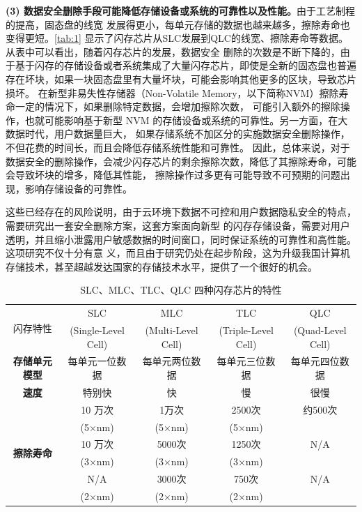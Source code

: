 \textbf{(3) 数据安全删除手段可能降低存储设备或系统的可靠性以及性能。}由于工艺制程的提高，固态盘的线宽
发展得更小，每单元存储的数据也越来越多，擦除寿命也变得更短\cite{Yaakobi2012Characterization,Shibata2012A}。\autoref{tab:1}
显示了闪存芯片从SLC发展到QLC的线宽、擦除寿命等数据。从表中可以看出，随着闪存芯片的发展，数据安全
删除的次数是不断下降的，由于基于闪存的存储设备或者系统集成了大量闪存芯片，即使是全新的固态盘也普遍
存在坏块，如果一块固态盘里有大量坏块，可能会影响其他更多的区块，导致芯片损坏\cite{Schroeder2016Flash}。
在新型非易失性存储器（Non-Volatile Memory，以下简称NVM）擦除寿命一定的情况下，如果删除特定数据，会增加擦除次数，
可能引入额外的擦除操作，也就可能影响基于新型 NVM 的存储设备或系统的可靠性。另一方面，在大数据时代，用户数据量巨大，
如果存储系统不加区分的实施数据安全删除操作，不但花费的时间长，而且会降低存储系统性能和可靠性。
因此，总体来说，对于数据安全的删除操作，会减少闪存芯片的剩余擦除次数，降低了其擦除寿命，可能会导致坏块的增多，降低其性能，
擦除操作过多更有可能导致不可预期的问题出现，影响存储设备的可靠性。

这些已经存在的风险说明，由于云环境下数据不可控和用户数据隐私安全的特点，需要研究出一套安全删除方案，这套方案面向新型
的闪存存储设备，需要对用户透明，并且缩小泄露用户敏感数据的时间窗口，同时保证系统的可靠性和高性能。这项研究不仅十分有意
义，而且由于研究仍处在起步阶段，这为升级我国计算机存储技术，甚至超越发达国家的存储技术水平，提供了一个很好的机会。
\begin{table}
\centering
\caption{SLC、MLC、TLC、QLC 四种闪存芯片的特性}\label{tab:1}
    \begin{tabular}{|*{5}{c|}}
\hline
    \multirow{2}{*}{闪存特性} & SLC & MLC & TLC & QLC \\
    & (Single-Level Cell) & (Multi-Level Cell) & (Triple-Level Cell) & (Quad-Level Cell) \\
\hline
    \textbf{存储单元模型} & 每单元一位数据 & 每单元两位数据 & 每单元三位数据 & 每单元四位数据 \\
\hline
    \textbf{速度} & 特别快 & 快 & 慢 & 很慢 \\
\hline
    \multirow{6}{*}{\textbf{擦除寿命}} & 10 万次 & 1万次 & 2500次 & 约500次 \\ %
        & (5×nm) & (5×nm) & (5×nm) & \\ \cline{2-5}
    & 10 万次 & 5000次 & 1250次 & N/A \\%
        & (3×nm) & (3×nm) & (3×nm) &\\ \cline{2-5}
    & N/A & 3000次 & 750次 & N/A \\ %
        & (2×nm) & (2×nm) & (2×nm) & \\ \hline
\end{tabular}
\end{table}


